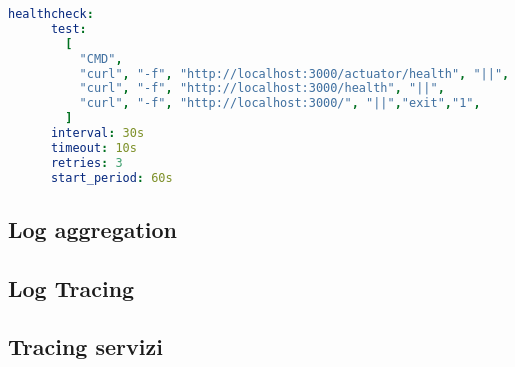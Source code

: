 \begin{lstlisting}[language=Yaml, caption={Health check API}, label=list:healt_API]
    healthcheck:
      test:
        [
          "CMD", 
          "curl", "-f", "http://localhost:3000/actuator/health", "||", 
          "curl", "-f", "http://localhost:3000/health", "||", 
          "curl", "-f", "http://localhost:3000/", "||","exit","1",
        ]
      interval: 30s
      timeout: 10s
      retries: 3
      start_period: 60s
\end{lstlisting}

\subsection{Log aggregation}

\subsection{Log Tracing}


\subsection{Tracing servizi}

